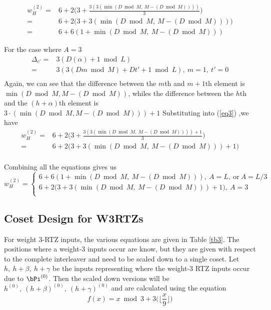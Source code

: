 \begin{equation*}
\begin{split}
w^{(2)}_H=&6+2\Big(3+\frac{3(3(\min(D \bmod M, ~M-(D \bmod M))))}{3}\Big)\\
=&6+2\Big(3+3(\min(D \bmod M,~M-(D \bmod M)))\Big)\\
=&6+6(1+\min(D \bmod M,~M-(D \bmod M)))
\end{split}
\end{equation*}

For the case where $A=3$
 \begin{equation}
 \begin{split}
 \Delta_{c'}=&3(D(\alpha) +1\bmod L)\\
 =&3(3(Dm \bmod M) + Dt' +1 \bmod L),~m=1,~t'=0\\
 \end{split}
 \end{equation}
 Again, we can see that the difference between the $m$th and $m+1$th element is $\min(D \bmod M, M-(D \bmod M))$, whiles the difference between the $h$th and the $(h+\alpha)$th element is $3 \cdot(\min(D \bmod M, M-(D \bmod M)))+1$
Substituting into (\ref{eq3}) ,we have
\begin{equation*}
\begin{split}
w^{(2)}_H=&6+2\Big(3+\frac{3(3(\min(D \bmod M, ~M-(D \bmod M))))+1}{3}\Big)\\
=&6+2\Big(3+3(\min(D \bmod M,~M-(D \bmod M)))+1\Big)\\
\end{split}
\end{equation*}

Combining all the equations gives us 
\begin{equation}
w^{(2)}_H=
\begin{cases}
6+6(1+\min(D \bmod M,~M-(D \bmod M))), ~A=L,~\text{or}~A=L/3 \\
6+2\Big(3+3(\min(D \bmod M,~M-(D \bmod M)))+1\Big), ~A=3\\
\end{cases}
\label{eq9}
\end{equation}

 \subsection{Coset Design for W3RTZs}
 For weight $3$-RTZ inputs, the various equations are given in Table \ref{tb3}. The positions where a weight-$3$ inputs occur are know, but they are given with respect to the complete interleaver and need to be scaled down to a single coset. 
 Let $h,~h+\beta,~h+\gamma$ be the inputs representing where the weight-$3$ RTZ inputs occur due to $\bPi^{(0)}$. Then the scaled down versions will be $h^{(0)},~(h+\beta)^{(0)},~(h+\gamma)^{(0)}$ and are calculated using the equation
 \begin{equation}
 f(x)= x \bmod 3 + 3\Big(\Big\lfloor\frac{x}{9} \Big\rfloor\Big)
 \label{eq9}
 \end{equation}
 
